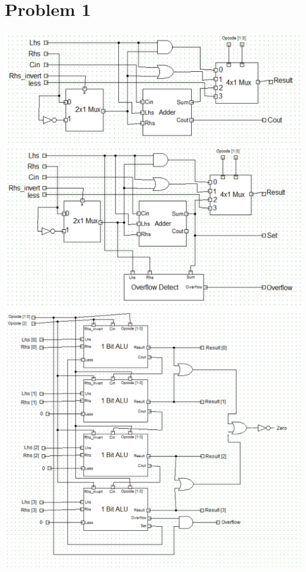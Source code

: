 \documentclass{article}
\newenvironment{problem}[1]{
  \nobreak\section*{Problem #1}
}{}
\begin{document}
\begin{problem}{1}
    \begin{center}
      \includegraphics[scale=0.65]{images/OneBitALU.jpg}
      \includegraphics[scale=0.65]{images/OneBitALU_Set.jpg}
      \includegraphics[scale=0.5]{images/ALU.jpg}
    \end{center}


\end{problem}
\end{document}
